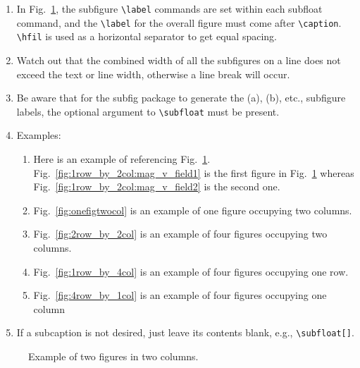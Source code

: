 \begin{enumerate}
	\item In Fig.~\ref{fig:1row_by_2col}, the subfigure \verb|\label| commands are set within each subfloat command, and the \verb|\label| for the overall figure must come after \verb|\caption|. \verb|\hfil| is used as a horizontal separator to get equal spacing. 
	
	\item Watch out that the combined width of all the subfigures on a line does not exceed the text or line width, otherwise a line break will occur.
	
 \item Be aware that for the subfig package to generate the (a), (b), etc., subfigure labels, the optional argument to \verb|\subfloat| must be present. 

	\item Examples:

	\begin{enumerate}
		\item Here is an example of referencing Fig.~\ref{fig:1row_by_2col}. Fig.~\ref{fig:1row_by_2col:mag_v_field1} is the first figure in Fig.~\ref{fig:1row_by_2col} whereas Fig.~\ref{fig:1row_by_2col:mag_v_field2} is the second one.
		
		\item Fig.~\ref{fig:onefigtwocol} is an example of one figure occupying two columns. 
		
		\item Fig.~\ref{fig:2row_by_2col} is an example of four figures occupying two columns.
		
		\item Fig.~\ref{fig:1row_by_4col} is an example of four figures occupying one row.
		
		\item Fig.~\ref{fig:4row_by_1col} is an example of four figures occupying one column
				
	\end{enumerate}
	
	\item If a subcaption is not desired, just leave its contents blank, e.g., \verb|\subfloat[]|.

\end{enumerate}


\begin{figure}[!tb]
	\centering
	\hfil
	\caption{Example of two figures in two columns.}
	\label{fig:1row_by_2col}
\end{figure}


